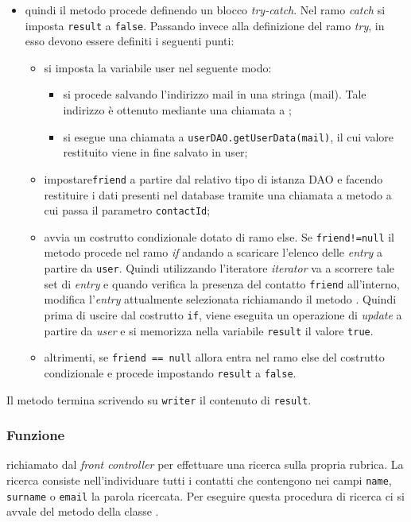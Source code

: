 \begin{description}
\begin{itemize}
		\item quindi il metodo procede definendo un blocco \textit{try-catch}. Nel ramo \textit{catch} si imposta \texttt{result} a \texttt{false}. Passando invece alla definizione del ramo \textit{try}, in esso devono essere definiti i seguenti punti:
		\begin{itemize}
			\item si imposta la variabile user nel seguente modo:
			\begin{itemize}
				\item si procede salvando l'indirizzo mail in una stringa (mail). Tale indirizzo è ottenuto mediante una chiamata a ;
				\item si esegue una chiamata a \texttt{userDAO.getUserData(mail)}, il cui valore restituito viene in fine salvato in user;
			\end{itemize}
			\item impostare\texttt{friend} a partire dal relativo tipo di istanza DAO e facendo restituire i dati presenti nel database tramite una chiamata a metodo  a cui passa il parametro \texttt{contactId};
			\item avvia un costrutto condizionale dotato di ramo else. Se \texttt{friend!=null} il metodo procede nel ramo \textit{if} andando a scaricare l'elenco delle \textit{entry} a partire da \texttt{user}. Quindi utilizzando l'iteratore \textit{iterator} va a scorrere tale set di \textit{entry} e quando verifica la presenza del contatto \texttt{friend} all'interno, modifica l'\textit{entry} attualmente selezionata richiamando il metodo . Quindi prima di uscire dal costrutto \texttt{if}, viene eseguita un operazione di \textit{update} a partire da \textit{user} e si memorizza nella variabile \texttt{result} il valore \texttt{true}.
			\item altrimenti, se \texttt{friend == null} allora entra nel ramo else del costrutto condizionale e procede impostando \texttt{result} a \texttt{false}.
		\end{itemize}
	\end{itemize}
	Il metodo termina scrivendo su \texttt{writer} il contenuto di \texttt{result}.
	
\end{description}



\subsubsection*{Funzione}
 richiamato dal \textit{front controller} per effettuare una ricerca sulla propria rubrica. La ricerca consiste nell'individuare tutti i contatti che contengono nei campi \texttt{name}, \texttt{surname} o \texttt{email} la parola ricercata. Per eseguire questa procedura di ricerca ci si avvale del metodo  della classe .

